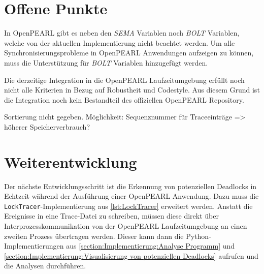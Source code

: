 \section{Offene Punkte}
\label{section:OffenePunkte}
In OpenPEARL gibt es neben den \textit{SEMA} Variablen noch \textit{BOLT}
Variablen, welche von der aktuellen Implementierung nicht beachtet werden. Um
alle Synchronisierungsprobleme in OpenPEARL Anwendungen aufzeigen zu können,
muss die Unterstützung für \textit{BOLT} Variablen hinzugefügt werden.

Die derzeitige Integration in die OpenPEARL Laufzeitumgebung erfüllt noch nicht
alle Kriterien in Bezug auf Robustheit und Codestyle. Aus diesem Grund ist die
Integration noch kein Bestandteil des offiziellen OpenPEARL Repository.

Sortierung nicht gegeben. Möglichkeit: Sequenznummer für Traceeinträge =>
höherer Speicherverbrauch?

\section{Weiterentwicklung}
\label{section:Weiterentwicklung}
Der nächste Entwicklungsschritt ist die Erkennung von potenziellen Deadlocks in
Echtzeit während der Ausführung einer OpenPEARL Anwendung. Dazu muss die
\texttt{LockTracer}-Implementierung aus \cref{lst:LockTracer} erweitert werden.
Anstatt die Ereignisse in eine Trace-Datei zu schreiben, müssen diese direkt
über Interprozesskommunikation von der OpenPEARL Laufzeitumgebung an einen
zweiten Prozess übertragen werden. Dieser kann dann die Python-Implementierungen
aus \cref{section:Implementierung:Analyse Programm} und
\cref{section:Implementierung:Visualisierung von potenziellen Deadlocks}
aufrufen und die Analysen durchführen.